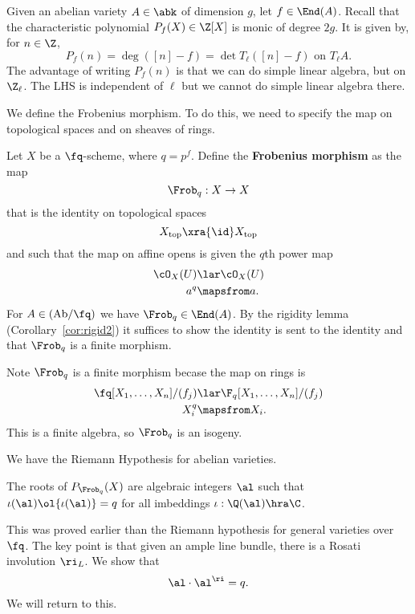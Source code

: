 
Given an abelian variety $A\in \abk$ of dimension $g$, let $f\in \End(A)$. Recall that the characteristic polynomial $P_f(X)\in \Z[X]$ is monic of degree $2g$. It is given by, for $n\in \Z$,
\[
P_f(n)=\deg([n]-f)=\det T_{\ell}([n]-f) \text{ on } T_{\ell}A.
\]
The advantage of writing $P_f(n)$ is that we can do simple linear algebra, but on $\Z_{\ell}$. The LHS is independent of $\ell$ but we cannot do simple linear algebra there.

\begin{ex}
We define the Frobenius morphism. To do this, we need to specify the map on topological spaces and on sheaves of rings. %

Let $X$ be a $\fq$-scheme, where $q=p^f$. Define the \textbf{Frobenius morphism} as the map 
\[
\Frob_q:X\to X
\]
that is the identity on topological spaces
\[
X_{\text{top}}  \xra{\id} X_{\text{top}}
\]
and such that the map on affine opens is given  the $q$th power map
\begin{align*}
\cO_X(U)& \lar \cO_X(U)\\
a^q&\mapsfrom a.
\end{align*}
For $A\in (\text{Ab}/\fq)$ we have $\Frob_q\in \End(A)$.
By the rigidity lemma (Corollary~\ref{cor:rigid2}) it suffices to show the identity is sent to the identity and that $\Frob_q$ is a finite morphism.

Note $\Frob_q$ is a finite morphism becase the map on rings is
\begin{align*}
\fq[X_1,\ldots, X_n] /(f_j) & \lar \F_q[X_1,\ldots, X_n]/(f_j)\\
 X_i^q&\mapsfrom X_i.
\end{align*}
This is a finite algebra, so $\Frob_q$ is an isogeny.
\end{ex}

We have the Riemann Hypothesis for abelian varieties.
\begin{thm}
The roots of $P_{\Frob_q}(X)$ are algebraic integers $\al$ such that $\iota(\al)\ol{\iota(\al)}=q$ for all imbeddings $\iota:\Q(\al)\hra \C$. 
\end{thm}
This was proved earlier than the Riemann hypothesis for general varieties over $\fq$.
The key point is that given an ample line bundle, there is a Rosati involution $\ri_L$. We show that 
\[
\al \cdot \al^{\ri}=q.
\]
We will return to this.

